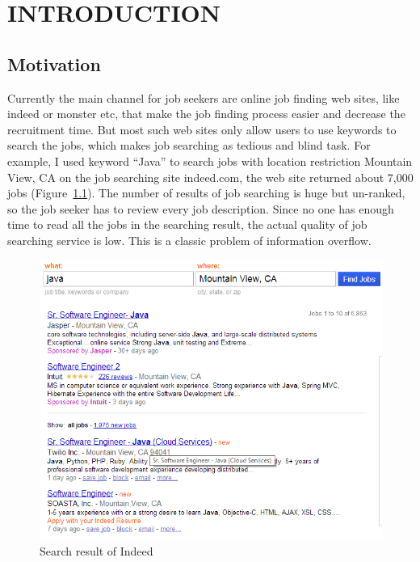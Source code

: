\chapter{INTRODUCTION}




\section{Motivation}
Currently the main channel for job seekers are online job finding web sites, like indeed or  monster etc, that make the job finding process easier and decrease the recruitment time. But most such web sites only allow users to use keywords to search the jobs, which makes job searching as tedious and blind task. For example, I used keyword ``Java'' to search jobs with location restriction Mountain View, CA on the job searching site indeed.com, the web site returned about 7,000 jobs (Figure~\ref{fig:Indeed}). The number of results of job searching is huge but un-ranked, so the job seeker has to review every job description. Since no one has enough time to read all the jobs in the searching result, the actual quality of job searching service is low. This is a classic problem of information overflow.


\begin{figure}[htbp]
  \centering
  \includegraphics[scale=0.6]{images/indeed1.png}
  \caption{Search result of Indeed}
  \label{fig:Indeed}
\end{figure}

